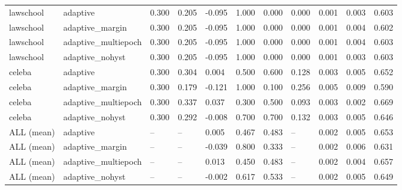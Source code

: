 \begin{table}[!t]
{\begin{tabular}{lllllllllll}
lawschool & adaptive & 0.300 & 0.205 & -0.095 & 1.000 & 0.000 & 0.000 & 0.001 & 0.003 & 0.603 \\
lawschool & adaptive\_margin & 0.300 & 0.205 & -0.095 & 1.000 & 0.000 & 0.000 & 0.001 & 0.004 & 0.602 \\
lawschool & adaptive\_multiepoch & 0.300 & 0.205 & -0.095 & 1.000 & 0.000 & 0.000 & 0.001 & 0.004 & 0.603 \\
lawschool & adaptive\_nohyst & 0.300 & 0.205 & -0.095 & 1.000 & 0.000 & 0.000 & 0.001 & 0.003 & 0.603 \\
celeba & adaptive & 0.300 & 0.304 & 0.004 & 0.500 & 0.600 & 0.128 & 0.003 & 0.005 & 0.652 \\
celeba & adaptive\_margin & 0.300 & 0.179 & -0.121 & 1.000 & 0.100 & 0.256 & 0.005 & 0.009 & 0.590 \\
celeba & adaptive\_multiepoch & 0.300 & 0.337 & 0.037 & 0.300 & 0.500 & 0.093 & 0.003 & 0.002 & 0.669 \\
celeba & adaptive\_nohyst & 0.300 & 0.292 & -0.008 & 0.700 & 0.700 & 0.132 & 0.003 & 0.005 & 0.646 \\
ALL (mean) & adaptive & -- & -- & 0.005 & 0.467 & 0.483 & -- & 0.002 & 0.005 & 0.653 \\
ALL (mean) & adaptive\_margin & -- & -- & -0.039 & 0.800 & 0.333 & -- & 0.002 & 0.006 & 0.631 \\
ALL (mean) & adaptive\_multiepoch & -- & -- & 0.013 & 0.450 & 0.483 & -- & 0.002 & 0.004 & 0.657 \\
ALL (mean) & adaptive\_nohyst & -- & -- & -0.002 & 0.617 & 0.533 & -- & 0.002 & 0.005 & 0.649 \\
\hline
\end{tabular}
}
\end{table}